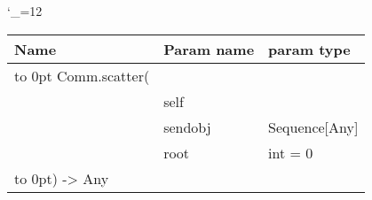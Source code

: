 \begingroup \catcode`\_=12 \tt
\begin{tabular}{lll}
\toprule
\textrm{Name}&\textrm{Param name}&\textrm{param type}\\
\midrule
\hbox to 0pt {Comm.scatter(\hss}\\
& self\\
& sendobj & Sequence[Any]\\
& root & int = 0\\
\hbox to 0pt{) -> Any\hss}\\
\bottomrule
\end{tabular}
\endgroup
